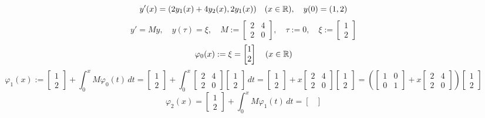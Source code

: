 \documentclass[a4paper,11.5pt]{article}
\begin{document}
	\begin{task}
		\[ y'(x)=(2y_1(x)+4y_2(x), 2y_1(x))\quad (x\in\mathbb{R}),\quad y(0)=(1,2) \]
		\[y'=My,\quad y(\tau)=\xi,\quad M:= \begin{bmatrix}
			2&4\\
			2&0
		\end{bmatrix},\quad \tau:=0,\quad \xi:=\begin{bmatrix}
			1\\
			2
		\end{bmatrix}\]
		\[ \varphi_0(x):=\xi=\begin{bmatrix}
			1\\
			2
		\end{bmatrix}\quad (x\in\mathbb{R}) \]
		\[ \varphi_1(x):=\begin{bmatrix}
			1\\
			2
		\end{bmatrix}+\int_0^xM\varphi_0(t)\,dt=\begin{bmatrix}
			1\\
			2
		\end{bmatrix}+\int_0^x \begin{bmatrix}
			2&4\\
			2&0
		\end{bmatrix}\begin{bmatrix}
			1\\
			2
		\end{bmatrix}\,dt=\begin{bmatrix}
			1\\
			2
		\end{bmatrix}+x \begin{bmatrix}
			2&4\\
			2&0
		\end{bmatrix}\begin{bmatrix}
			1\\
			2
		\end{bmatrix}=\left( \begin{bmatrix}
			1&0\\
			0&1
		\end{bmatrix} + x \begin{bmatrix}
			2&4\\
			2&0
		\end{bmatrix} \right) \begin{bmatrix}
			1\\
			2
		\end{bmatrix} \]
		\[\varphi_2(x)=\begin{bmatrix}
			1\\
			2
		\end{bmatrix}+\int_0^xM\varphi_1(t)\,dt=\begin{bmatrix}

\end{bmatrix}\]
\end{task}
\end{document}

